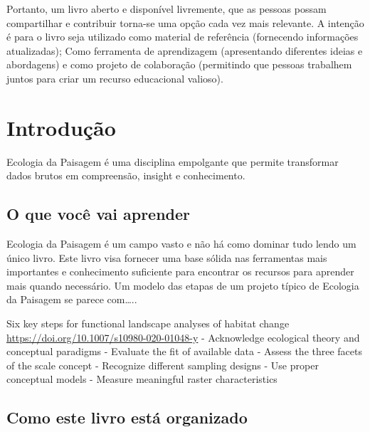 \documentclass[
]{article}
\begin{document}
Portanto, um livro aberto e disponível livremente, que as pessoas possam compartilhar e contribuir torna-se uma opção cada vez mais relevante. A intenção é para o livro seja utilizado como material de referência (fornecendo informações atualizadas); Como ferramenta de aprendizagem (apresentando diferentes ideias e abordagens) e como projeto de colaboração (permitindo que pessoas trabalhem juntos para criar um recurso educacional valioso).

\newpage{}

\hypertarget{introduuxe7uxe3o}{%
\section*{Introdução}\label{introduuxe7uxe3o}}

Ecologia da Paisagem é uma disciplina empolgante que permite transformar dados brutos em compreensão, insight e conhecimento.

\hypertarget{o-que-vocuxea-vai-aprender}{%
\subsection*{O que você vai aprender}\label{o-que-vocuxea-vai-aprender}}

Ecologia da Paisagem é um campo vasto e não há como dominar tudo lendo um único livro.
Este livro visa fornecer uma base sólida nas ferramentas mais importantes e conhecimento suficiente para encontrar os recursos para aprender mais quando necessário. Um modelo das etapas de um projeto típico de Ecologia da Paisagem se parece com\ldots..

Six key steps for functional landscape analyses of habitat
change \url{https://doi.org/10.1007/s10980-020-01048-y}
- Acknowledge ecological theory and conceptual paradigms
- Evaluate the fit of available data
- Assess the three facets of the scale concept
- Recognize different sampling designs
- Use proper conceptual models
- Measure meaningful raster characteristics

\hypertarget{como-este-livro-estuxe1-organizado}{%
\subsection*{Como este livro está organizado}\label{como-este-livro-estuxe1-organizado}}
\end{document}
